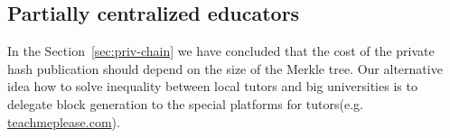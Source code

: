 \subsection{Partially centralized educators}
\label{apx:pools}

In the Section~\ref{sec:priv-chain} we have concluded that the cost of the
private hash publication should depend on the size of the Merkle tree. Our
alternative idea how to solve inequality between local tutors and big
universities is to delegate block generation to the special platforms for
tutors(e.g. \url{teachmeplease.com}).
